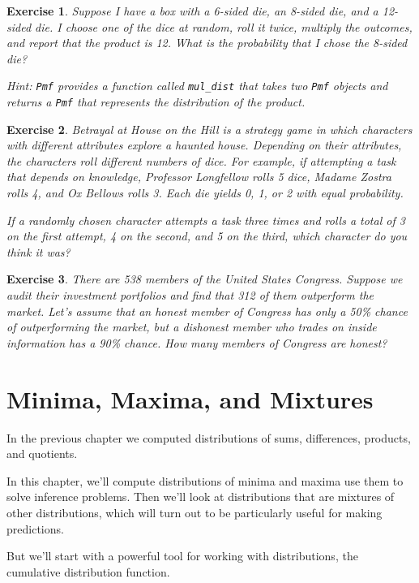 \documentclass[12pt]{book}
\theoremstyle{exercise}
\newtheorem{exercise}{Exercise}[chapter]
\newcommand{\py}[1]{{\tt #1}}%
\begin{document}
\begin{exercise}
Suppose I have a box with a 6-sided die, an 8-sided die, and a 12-sided die.
I choose one of the dice at random, roll it twice, multiply the outcomes, and report that the product is 12.
What is the probability that I chose the 8-sided die?

Hint: \py{Pmf} provides a function called \py{mul_dist} that takes two \py{Pmf} objects and returns a \py{Pmf} that represents the distribution of the product.
\end{exercise}


\begin{exercise}
{\it Betrayal at House on the Hill} is a strategy game in which characters with different attributes explore a haunted house.  Depending on their attributes, the characters roll different numbers of dice.  For example, if attempting a task that depends on knowledge, Professor Longfellow rolls 5 dice, Madame Zostra rolls 4, and Ox Bellows rolls 3.  Each die yields 0, 1, or 2 with equal probability.

If a randomly chosen character attempts a task three times and rolls a total of 3 on the first attempt, 4 on the second, and 5 on the third, which character do you think it was?
\end{exercise}


\begin{exercise}
There are 538 members of the United States Congress.
Suppose we audit their investment portfolios and find that 312 of them outperform the market.
Let's assume that an honest member of Congress has only a 50\% chance of outperforming the market, but a dishonest member who trades on inside information has a 90\% chance.  How many members of Congress are honest?
\end{exercise}



\chapter{Minima, Maxima, and Mixtures}

In the previous chapter we computed distributions of sums, differences, products, and quotients.

In this chapter, we'll compute distributions of minima and maxima use them to solve inference problems.
Then we'll look at distributions that are mixtures of other distributions, which will turn out to be particularly useful for making predictions.

But we'll start with a powerful tool for working with distributions, the cumulative distribution function.
\end{document}
